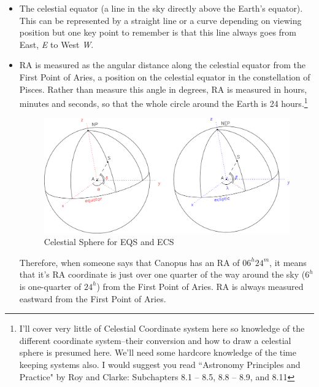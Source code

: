 \documentclass[a4paper,12pt]{extarticle}
\begin{document}
\begin{itemize}
    \item The celestial equator (a line in the sky directly above the Earth’s equator). This can be represented by a straight line or a curve depending on viewing position but one key point to remember is that this line always goes from East, \textit{E} to West\textit{ W}.
    \item RA is measured as the angular distance along the celestial equator from the First Point of Aries, a position on the celestial equator in the constellation of Pisces. Rather than measure this angle in degrees, RA is measured in hours, minutes and seconds, so that the whole circle around the Earth is 24 hours.\footnote{I'll cover very little of Celestial Coordinate system here so knowledge of the different coordinate system--their conversion and how to draw a celestial sphere is presumed here. We'll need some hardcore knowledge of the time keeping systems also. I would suggest you read ``Astronomy Principles and Practice" by Roy and Clarke: Subchapters 8.1 – 8.5, 8.8 – 8.9, and 8.11}
    
    \begin{figure}[H]
    \centering
    \includegraphics[width=\linewidth]{cel.png}
    \caption{Celestial Sphere for EQS and ECS}
\end{figure}
    
    Therefore, when someone says that Canopus has an RA of $06^h 24^m$, it means that it's RA coordinate is just over one quarter of the way around the sky ($6^h$ is one-quarter of $24^h$) from the First Point of Aries. RA is always measured eastward from the First Point of Aries.
\end{itemize}
\end{document}
